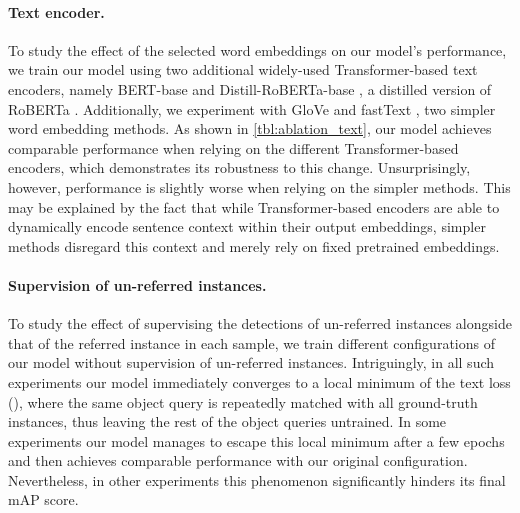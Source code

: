 \documentclass[10pt,twocolumn,letterpaper]{article}
\renewcommand{\cite}[1]{\citep{#1}}
\begin{document}
\paragraph{Text encoder.} To study the effect of the selected word embeddings on our model's performance, we train our model using two additional widely-used Transformer-based text encoders, namely BERT-base \cite{Devlin2019BERTPO} and Distill-RoBERTa-base \cite{sanh2019distilbert}, a distilled version of RoBERTa \cite{liu2019roberta}. Additionally, we experiment with GloVe \cite{pennington2014glove} and fastText \cite{bojanowski2017enrichingfasttext}, two simpler word embedding methods. As shown in \cref{tbl:ablation_text}, our model achieves comparable performance when relying on the different Transformer-based encoders, which demonstrates its robustness to this change. Unsurprisingly, however, performance is slightly worse when relying on the simpler methods. This may be explained by the fact that while Transformer-based encoders are able to dynamically encode sentence context within their output embeddings, simpler methods disregard this context and merely rely on fixed pretrained embeddings.

\paragraph{Supervision of un-referred instances.} To study the effect of supervising the detections of un-referred instances alongside that of the referred instance in each sample, we train different configurations of our model without supervision of un-referred instances. Intriguingly, in all such experiments our model immediately converges to a local minimum of the text loss (), where the same object query is repeatedly matched with all ground-truth instances, thus leaving the rest of the object queries untrained. In some experiments our model manages to escape this local minimum after a few epochs and then achieves comparable performance with our original configuration. Nevertheless, in other experiments this phenomenon significantly hinders its final mAP score. 
\end{document}
